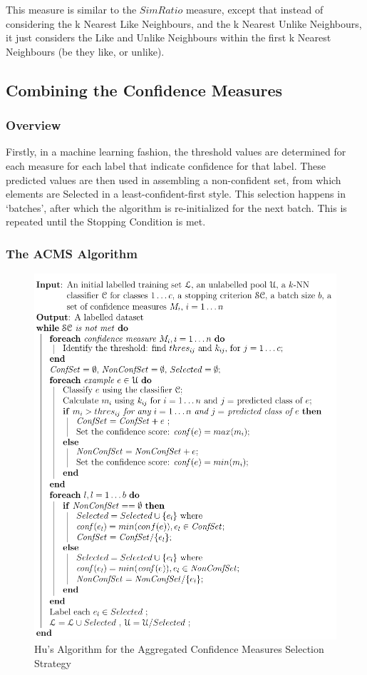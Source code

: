 \documentclass[a4paper,11pt]{report}
\begin{document}
This measure is similar to the $SimRatio$ measure, except that instead of considering the k Nearest Like Neighbours, and the k Nearest Unlike Neighbours, it just considers the Like and Unlike Neighbours within the first k Nearest Neighbours (be they like, or unlike).

\subsection{Combining the Confidence Measures}

\subsubsection{Overview}
Firstly, in a machine learning fashion, the threshold values are determined for each measure for each label that indicate confidence for that label. These predicted values are then used in assembling a non-confident set, from which elements are Selected in a least-confident-first style. This selection happens in `batches', after which the algorithm is re-initialized for the next batch. This is repeated until the Stopping Condition is met.

\pagebreak

\begin{samepage}

\subsubsection{The ACMS Algorithm}
\begin{figure}[h!] \centering
\includegraphics[scale=0.75]{./Others/Hu2011AggregrateAlgorithm}
\caption*{Hu's Algorithm for the Aggregated Confidence Measures Selection Strategy}
\end{figure}
\end{samepage}
\end{document}
